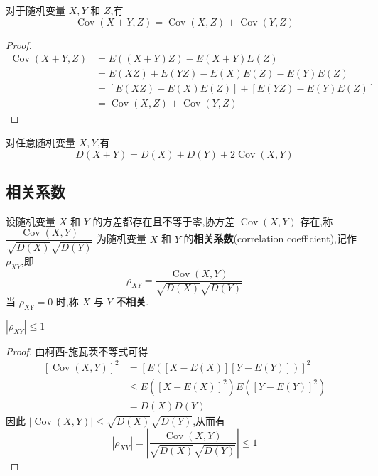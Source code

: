 \begin{property}
    对于随机变量 $X,Y$ 和 $Z$,有
    $$
    \operatorname{Cov}(X+Y,Z) = \operatorname{Cov}(X,Z) + \operatorname{Cov}(Y,Z)
    $$
\end{property}

\begin{proof}
    $$
    \begin{aligned}
        \operatorname{Cov}(X+Y,Z) &= E((X+Y)Z) - E(X+Y) E(Z) \\
        &= E(XZ) + E(YZ) - E(X) E(Z) - E(Y) E(Z) \\
        &= [E(XZ) - E(X) E(Z)] + [E(YZ) - E(Y) E(Z)] \\
        &= \operatorname{Cov}(X,Z) + \operatorname{Cov}(Y,Z)
    \end{aligned}
    $$
\end{proof}

\begin{property}
    对任意随机变量 $X,Y$,有
    $$
    D(X \pm Y) = D(X) + D(Y) \pm 2 \operatorname{Cov}(X,Y)
    $$
\end{property}

\subsection{相关系数}

\begin{definition}
    设随机变量 $X$ 和 $Y$ 的方差都存在且不等于零,协方差 $\operatorname{Cov}(X,Y)$ 存在,称 $\dfrac{\operatorname{Cov}(X,Y)}{\sqrt{D(X)} \sqrt{D(Y)}}$ 为随机变量 $X$ 和 $Y$ 的\textbf{相关系数}(correlation coefficient),记作 $\rho_{XY}$,即
    $$
    \rho_{XY} = \dfrac{\operatorname{Cov}(X,Y)}{\sqrt{D(X)} \sqrt{D(Y)}}
    $$
    当 $\rho_{XY} = 0$ 时,称 $X$ 与 $Y$ \textbf{不相关}.
\end{definition}

\begin{property}
    $|\rho_{XY}| \leqslant 1$
\end{property}

\vspace{-1.5em}

\begin{proof}
    由柯西-施瓦茨不等式可得
    $$
    \begin{aligned}
        \left[ \operatorname{Cov}(X,Y) \right]^2 &= [E([X-E(X)][Y-E(Y)])]^2 \\
        & \leqslant E([X-E(X)]^2) E([Y-E(Y)]^2) \\
        &= D(X) D(Y)
    \end{aligned}
    $$
    因此 $|\operatorname{Cov}(X,Y)| \leqslant \sqrt{D(X)} \sqrt{D(Y)}$,从而有
    $$
    |\rho_{XY}| = \left| \dfrac{\operatorname{Cov}(X,Y)}{\sqrt{D(X)} \sqrt{D(Y)}} \right| \leqslant 1
    $$

    \vspace{-2.3em}
\end{proof}

